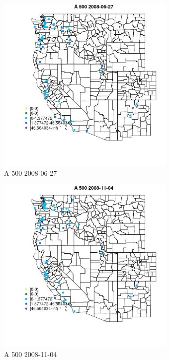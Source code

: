 \begin{figure} 
\centering  
\includegraphics[width=0.77\textwidth]{Code_Outputs/Report_ML_input_PM25_Step4_part_e_de_duplicated_aves_MapObsA_5002008-06-27.jpg} 
\caption{\label{fig:Report_ML_input_PM25_Step4_part_e_de_duplicated_avesMapObsA_5002008-06-27}A 500 2008-06-27} 
\end{figure} 
 

\begin{figure} 
\centering  
\includegraphics[width=0.77\textwidth]{Code_Outputs/Report_ML_input_PM25_Step4_part_e_de_duplicated_aves_MapObsA_5002008-11-04.jpg} 
\caption{\label{fig:Report_ML_input_PM25_Step4_part_e_de_duplicated_avesMapObsA_5002008-11-04}A 500 2008-11-04} 
\end{figure} 
 

